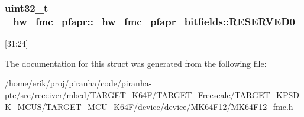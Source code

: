 \subsubsection[{\texorpdfstring{R\+E\+S\+E\+R\+V\+E\+D0}{RESERVED0}}]{\setlength{\rightskip}{0pt plus 5cm}uint32\+\_\+t \+\_\+hw\+\_\+fmc\+\_\+pfapr\+::\+\_\+hw\+\_\+fmc\+\_\+pfapr\+\_\+bitfields\+::\+R\+E\+S\+E\+R\+V\+E\+D0}\hypertarget{struct__hw__fmc__pfapr_1_1__hw__fmc__pfapr__bitfields_a3889bb7c4930fee3d2e480583cac85c6}{}\label{struct__hw__fmc__pfapr_1_1__hw__fmc__pfapr__bitfields_a3889bb7c4930fee3d2e480583cac85c6}
\mbox{[}31\+:24\mbox{]} 

The documentation for this struct was generated from the following file\+:\begin{DoxyCompactItemize}
\item 
/home/erik/proj/piranha/code/piranha-\/ptc/src/receiver/mbed/\+T\+A\+R\+G\+E\+T\+\_\+\+K64\+F/\+T\+A\+R\+G\+E\+T\+\_\+\+Freescale/\+T\+A\+R\+G\+E\+T\+\_\+\+K\+P\+S\+D\+K\+\_\+\+M\+C\+U\+S/\+T\+A\+R\+G\+E\+T\+\_\+\+M\+C\+U\+\_\+\+K64\+F/device/device/\+M\+K64\+F12/M\+K64\+F12\+\_\+fmc.\+h\end{DoxyCompactItemize}
